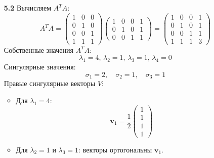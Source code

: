 \documentclass[a4paper]{article}
\begin{document}
\begin{enumerate}
\begin{enumerate}
  \item[\textbf{5.2}]
  Вычисляем \( A^T A \):  
  \[
  A^T A = \begin{pmatrix}
  1 & 0 & 0 \\
  0 & 1 & 0 \\
  0 & 0 & 1 \\
  1 & 1 & 1
  \end{pmatrix} \begin{pmatrix}
  1 & 0 & 0 & 1 \\
  0 & 1 & 0 & 1 \\
  0 & 0 & 1 & 1
  \end{pmatrix} = \begin{pmatrix}
  1 & 0 & 0 & 1 \\
  0 & 1 & 0 & 1 \\
  0 & 0 & 1 & 1 \\
  1 & 1 & 1 & 3
  \end{pmatrix}
  \]
  Собственные значения \( A^T A \):  
  \[
  \lambda_1 = 4, \, \lambda_2 = 1, \, \lambda_3 = 1, \, \lambda_4 = 0
  \]  
  Сингулярные значения:  
  \[
  \sigma_1 = 2, \quad \sigma_2 = 1, \quad \sigma_3 = 1
  \]
  Правые сингулярные векторы \( V \):  
  \begin{itemize}
    \item 
    Для \( \lambda_1 = 4 \):  
    \[
    \mathbf{v}_1 = \frac{1}{2} \begin{pmatrix} 1 \\ 1 \\ 1 \\ 1 \end{pmatrix}
    \]  

    \item
    Для \( \lambda_2 = 1 \) и \( \lambda_3 = 1 \): векторы ортогональны 
    \( \mathbf{v}_1 \).
  \end{itemize}


\end{enumerate}
\end{enumerate}
\end{document}
